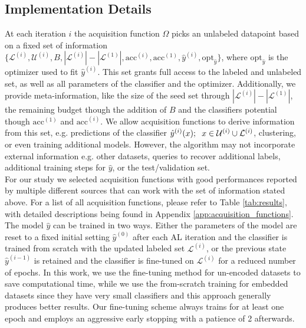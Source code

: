 \documentclass[]{article}
\begin{document}
\subsection{Implementation Details}\label{sec:implementation_details}
At each iteration $i$ the acquisition function $\Omega$ picks an unlabeled datapoint based on a fixed set of information $\{\mathcal{L}^{(i)}, \mathcal{U}^{(i)}, B, |\mathcal{L}^{(i)}|-|\mathcal{L}^{(1)}|, \text{acc}^{(i)}, \text{acc}^{(1)}, \hat y^{(i)}, \text{opt}_{\hat y}\}$, where $\text{opt}_{\hat y}$ is the optimizer used to fit $\hat y^{(i)}$.
This set grants full access to the labeled and unlabeled set, as well as all parameters of the classifier and the optimizer.
Additionally, we provide meta-information, like the size of the seed set through $|\mathcal{L}^{(i)}|-|\mathcal{L}^{(1)}|$, the remaining budget though the addition of $B$ and the classifiers potential though $\text{acc}^{(1)}$ and $\text{acc}^{(i)}$.
We allow acquisition functions to derive information from this set, e.g. predictions of the classifier $\hat y^{(i)}(x); \hspace{2mm} x \in \mathcal{U}^{(i)} \cup \mathcal{L}^{(i)}$, clustering, or even training additional models.
However, the algorithm may not incorporate external information e.g. other datasets, queries to recover additional labels, additional training steps for $\hat y$, or the test/validation set. \\
For our study we selected acquisition functions with good performances reported by multiple different sources that can work with the set of information stated above.
For a list of all acquisition functions, please refer to Table \ref{tab:results}, with detailed descriptions being found in Appendix \ref{app:acquisition_functions}. \\ [1mm]
%
The model $\hat y$ can be trained in two ways. Either the parameters of the model are reset to a fixed initial setting $\hat y^{(0)}$ after each AL iteration and the classifier is trained from scratch with the updated labeled set $\mathcal{L}^{(i)}$, or the previous state $\hat y^{(i-1)}$ is retained and the classifier is fine-tuned on $\mathcal{L}^{(i)}$ for a reduced number of epochs.
In this work, we use the fine-tuning method for un-encoded datasets to save computational time, while we use the from-scratch training for embedded datasets since they have very small classifiers and this approach generally produces better results.
Our fine-tuning scheme always trains for at least one epoch and employs an aggressive early stopping with a patience of 2 afterwards.
\end{document}

